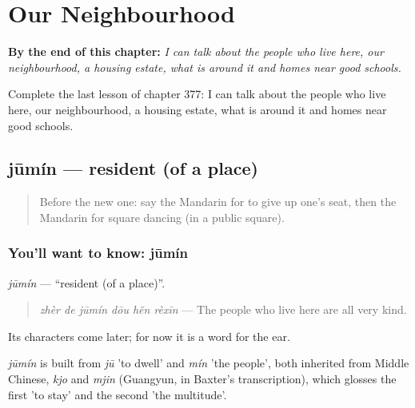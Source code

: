 
\chapter{Our Neighbourhood}
\label{ch:zh-our-neighbourhood}

\begin{chapteropening}
\textbf{By the end of this chapter:} \emph{I can talk about the people who live here, our neighbourhood, a housing estate, what is around it and homes near good schools.}

Complete the last lesson of chapter 377: I can talk about the people who live here, our neighbourhood, a housing estate, what is around it and homes near good schools.
\end{chapteropening}

\section[jūmín]{jūmín — resident (of a place)}

\label{lesson:ZH-C377-jumin}



\begin{quote}
Before the new one: say the Mandarin for to give up one's seat, then the Mandarin for square dancing (in a public square).
\end{quote}

\subsection*{You'll want to know: jūmín}
\emph{jūmín} — \textquotedblleft{}resident (of a place)\textquotedblright{}.

\begin{quote}
\emph{zhèr de jūmín dōu hěn rèxīn} — The people who live here are all very kind.
\end{quote}

Its characters come later; for now it is a word for the ear.

\begin{cousinweb}
\emph{jūmín} is built from \emph{jū} 'to dwell' and \emph{mín} 'the people', both inherited from Middle Chinese, \emph{kjo} and \emph{mjin} (Guangyun, in Baxter's transcription), which glosses the first 'to stay' and the second 'the multitude'.
\end{cousinweb}

